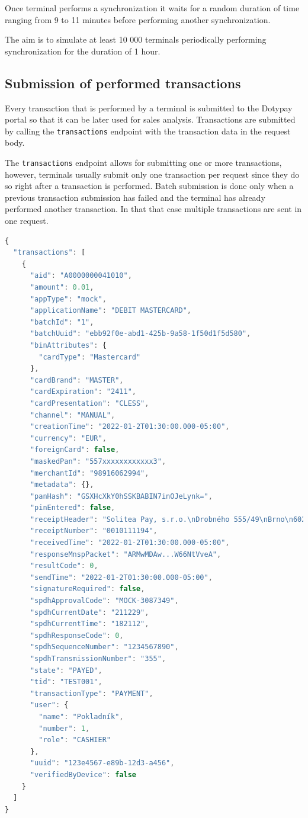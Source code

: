 \documentclass[12pt, a4paper]{article}
\begin{document}
Once terminal performs a synchronization it waits for a random duration of time ranging from 9 to 11 minutes before performing another synchronization.

The aim is to simulate at least 10 000 terminals periodically performing synchronization for the duration of 1 hour.

\subsection{Submission of performed transactions}

Every transaction that is performed by a terminal is submitted to the Dotypay portal so that it can be later used for sales analysis.
Transactions are submitted by calling the \texttt{transactions} endpoint with the transaction data in the request body.

The \texttt{transactions} endpoint allows for submitting one or more transactions, however, terminals usually submit only one transaction per request since they do so right after a transaction is performed.
Batch submission is done only when a previous transaction submission has failed and the terminal has already performed another transaction.
In that that case multiple transactions are sent in one request.

\begin{lstlisting}[language=JavaScript, caption={Transaction submission request body},captionpos=b, basicstyle=\tiny]
{
  "transactions": [
    {
      "aid": "A0000000041010",
      "amount": 0.01,
      "appType": "mock",
      "applicationName": "DEBIT MASTERCARD",
      "batchId": "1",
      "batchUuid": "ebb92f0e-abd1-425b-9a58-1f50d1f5d580",
      "binAttributes": {
        "cardType": "Mastercard"
      },
      "cardBrand": "MASTER",
      "cardExpiration": "2411",
      "cardPresentation": "CLESS",
      "channel": "MANUAL",
      "creationTime": "2022-01-2T01:30:00.000-05:00",
      "currency": "EUR",
      "foreignCard": false,
      "maskedPan": "557xxxxxxxxxxxx3",
      "merchantId": "98916062994",
      "metadata": {},
      "panHash": "GSXHcXkY0hSSKBABIN7inOJeLynk=",
      "pinEntered": false,
      "receiptHeader": "Solitea Pay, s.r.o.\nDrobného 555/49\nBrno\n60200\nIČO: 25595091\nTID: TEST001   ",
      "receiptNumber": "0010111194",
      "receivedTime": "2022-01-2T01:30:00.000-05:00",
      "responseMnspPacket": "ARMwMDAw...W66NtVveA",
      "resultCode": 0,
      "sendTime": "2022-01-2T01:30:00.000-05:00",
      "signatureRequired": false,
      "spdhApprovalCode": "MOCK-3087349",
      "spdhCurrentDate": "211229",
      "spdhCurrentTime": "182112",
      "spdhResponseCode": 0,
      "spdhSequenceNumber": "1234567890",
      "spdhTransmissionNumber": "355",
      "state": "PAYED",
      "tid": "TEST001",
      "transactionType": "PAYMENT",
      "user": {
        "name": "Pokladník",
        "number": 1,
        "role": "CASHIER"
      },
      "uuid": "123e4567-e89b-12d3-a456",
      "verifiedByDevice": false
    }
  ]
}
\end{lstlisting}
\end{document}

